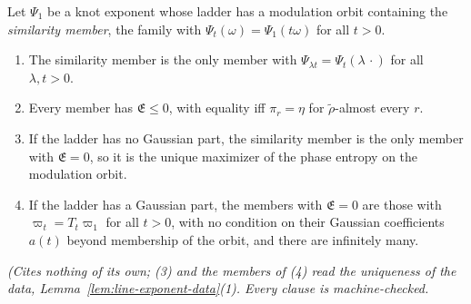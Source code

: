 \begin{theorem}
\label{thm:phase-entropy-selection}
\leanok
Let $\Psi_1$ be a knot exponent whose ladder has a modulation orbit containing the \emph{similarity member}, the family
with $\Psi_t(\omega) = \Psi_1(t\omega)$ for all $t > 0$.
\begin{enumerate}
\item The similarity member is the only member with $\Psi_{\lambda t} = \Psi_t(\lambda\,\cdot)$ for
all $\lambda, t > 0$.
\item Every member has $\mathfrak{E} \le 0$, with equality iff $\pi_r = \eta$ for
$\tilde\rho$-almost every $r$.
\item If the ladder has no Gaussian part, the similarity member is the only member with
$\mathfrak{E} = 0$, so it is the unique maximizer of the phase entropy on the modulation orbit.
\item If the ladder has a Gaussian part, the members with $\mathfrak{E} = 0$ are those with
$\varpi_t = T_t\varpi_1$ for all $t > 0$, with no condition on their Gaussian coefficients $a(t)$
beyond membership of the orbit, and there are infinitely many.
\end{enumerate}
\statusT\quad\emph{(Cites nothing of its own; (3) and the members of (4) read the uniqueness of the
data, Lemma~\ref{lem:line-exponent-data}(1). Every clause is machine-checked.
}
\end{theorem}

